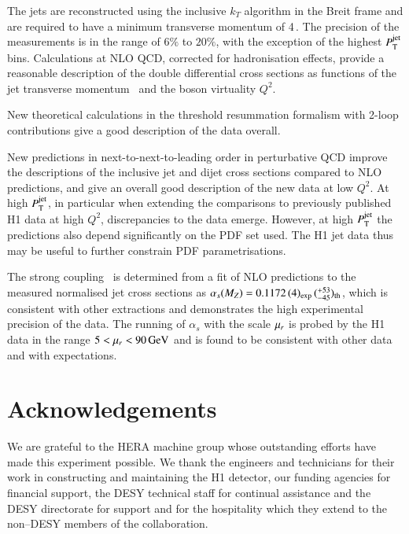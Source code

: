 \documentclass[12pt]{article}
\begin{document}
The jets are reconstructed using the inclusive $k_T$ algorithm 
in the Breit frame and are required to have a minimum
transverse momentum of 4\,\GeV.
The precision of the measurements is in the range of $6\%$ to $20\%$,
with the exception of the highest $\ptjet$ bins.
Calculations at NLO QCD, corrected for hadronisation effects, provide a
reasonable description of the double differential cross sections as
functions of the jet transverse momentum \pt\ and the boson virtuality
$Q^2$.

New theoretical calculations in the threshold resummation formalism with 2-loop contributions
give a good description of the data overall.

New predictions in  next-to-next-to-leading order in perturbative QCD  improve the descriptions of the inclusive jet
and dijet cross sections compared to NLO predictions, and give an
overall good description of the new data at low $Q^2$. At high
$\ptjet$, in particular when extending the comparisons to previously
published H1 data at high $Q^2$, discrepancies to the data emerge.
However, at high $\ptjet$ the predictions also depend significantly on
the PDF set used. The H1 jet data thus may be useful to further
constrain PDF parametrisations.

The strong coupling \asmz\ is determined from a fit of NLO predictions 
to the measured normalised jet cross sections as
$ \alpha_s(M_Z) = 0.1172\,(4)_{\rm exp}\,(^{+53}_{-45})_{\rm th}$, which is
consistent with other extractions and demonstrates the high
experimental precision of the data. The running of $ \alpha_s$ with
the scale $\mur$ is probed by the H1 data in the range $5 <
\mur < 90\,\GeV$ and is found to be consistent with other data and with
expectations.


 


\section*{Acknowledgements}
We are grateful to the HERA machine group whose outstanding
efforts have made this experiment possible.
We thank the engineers and technicians for their work in constructing and
maintaining the H1 detector, our funding agencies for
financial support, the
DESY technical staff for continual assistance
and the DESY directorate for support and for the
hospitality which they extend to the non--DESY
members of the collaboration.
\end{document}
